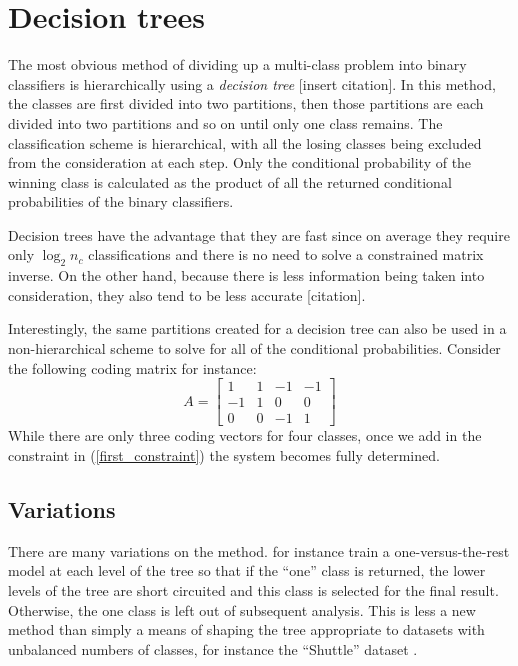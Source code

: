 \documentclass{article}
\begin{document}
\section{Decision trees}

The most obvious method of dividing up a multi-class problem into binary
classifiers is hierarchically using a {\it decision tree} [insert citation].
In this method, the classes are first divided into two partitions, then
those partitions are each divided into two partitions and so on until only
one class remains. The classification scheme is hierarchical, with all the
losing classes being excluded from the consideration at each step.
Only the conditional probability of the winning class is calculated as the
product of all the returned conditional probabilities of the binary
classifiers.

Decision trees have the advantage that they are fast since on average they
require only $\log_2 n_c$ classifications and there is no need to solve a 
constrained matrix inverse. On the other hand, because there is less
information being taken into consideration, they also tend to be less
accurate [citation].

Interestingly, the same partitions created for a decision tree can also
be used in a non-hierarchical scheme
to solve for all of the conditional probabilities. Consider the following
coding matrix for instance:
\begin{equation}
A = 
\begin{bmatrix}
1 & 1 & -1 & -1 \\
-1 & 1 & 0 & 0 \\
0 & 0 & -1 & 1
\end{bmatrix}
\end{equation}
While there are only three coding vectors for four classes, 
once we add in the constraint in (\ref{first_constraint}) the system becomes 
fully determined.

\subsection{Variations}

There are many variations on the method. \citet{Ramanan_etal2007} for instance train a 
one-versus-the-rest model at each level of the tree so that if the ``one''
class is returned, the lower levels of the tree are short circuited
and this class is selected for the final result. Otherwise, the one class
is left out of subsequent analysis. This is less a new method than simply
a means of shaping the tree appropriate to datasets with unbalanced
numbers of classes, for instance the ``Shuttle'' dataset \citep{King_etal1995}.
\end{document}
